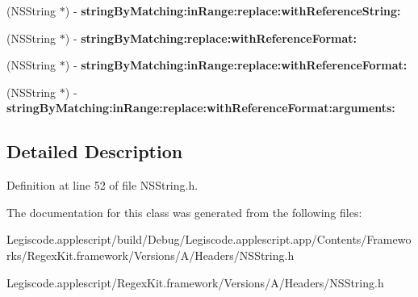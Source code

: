 \begin{DoxyCompactItemize}
\item 
\hypertarget{interface_n_s_string_07_regex_kit_additions_08_aeabaa7f5d347f24311f8de8f990b82ce}{(N\-S\-String $\ast$) -\/ {\bfseries string\-By\-Matching\-:in\-Range\-:replace\-:with\-Reference\-String\-:}}\label{interface_n_s_string_07_regex_kit_additions_08_aeabaa7f5d347f24311f8de8f990b82ce}

\item 
\hypertarget{interface_n_s_string_07_regex_kit_additions_08_aafa2e718ee6cca45bb63816872fc005f}{(N\-S\-String $\ast$) -\/ {\bfseries string\-By\-Matching\-:replace\-:with\-Reference\-Format\-:}}\label{interface_n_s_string_07_regex_kit_additions_08_aafa2e718ee6cca45bb63816872fc005f}

\item 
\hypertarget{interface_n_s_string_07_regex_kit_additions_08_a9e8bd0577e98bea491b10eac648a3e1f}{(N\-S\-String $\ast$) -\/ {\bfseries string\-By\-Matching\-:in\-Range\-:replace\-:with\-Reference\-Format\-:}}\label{interface_n_s_string_07_regex_kit_additions_08_a9e8bd0577e98bea491b10eac648a3e1f}

\item 
\hypertarget{interface_n_s_string_07_regex_kit_additions_08_af72979ecf53901259ebe5922745442eb}{(N\-S\-String $\ast$) -\/ {\bfseries string\-By\-Matching\-:in\-Range\-:replace\-:with\-Reference\-Format\-:arguments\-:}}\label{interface_n_s_string_07_regex_kit_additions_08_af72979ecf53901259ebe5922745442eb}

\end{DoxyCompactItemize}


\subsection{Detailed Description}


Definition at line 52 of file N\-S\-String.\-h.



The documentation for this class was generated from the following files\-:\begin{DoxyCompactItemize}
\item 
Legiscode.\-applescript/build/\-Debug/\-Legiscode.\-applescript.\-app/\-Contents/\-Frameworks/\-Regex\-Kit.\-framework/\-Versions/\-A/\-Headers/N\-S\-String.\-h\item 
Legiscode.\-applescript/\-Regex\-Kit.\-framework/\-Versions/\-A/\-Headers/N\-S\-String.\-h\end{DoxyCompactItemize}
